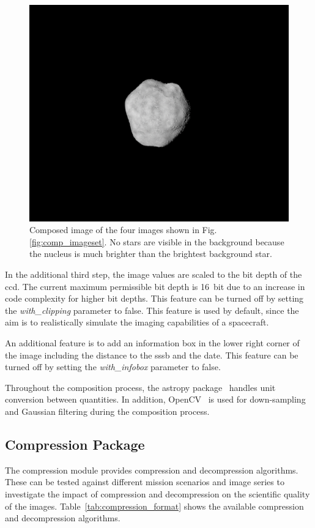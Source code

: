 \begin{figure}[htb]
    \centering
    \includegraphics[width=\textwidth]{doc/thesis/0_figures/composition/Comp_2017-08-15T115854-575000.png}
    \caption{Composed image of the four images shown in Fig. \ref{fig:comp_imageset}. No stars are visible in the background because the nucleus is much brighter than the brightest background star.}
    \label{fig:comp_composed}
\end{figure}

In the additional third step, the image values are scaled to the bit depth of the \gls{ccd}. The current maximum permissible bit depth is \SI{16}{bit} due to an increase in code complexity for higher bit depths. This feature can be turned off by setting the \textit{with\_clipping} parameter to false. This feature is used by default, since the aim is to realistically simulate the imaging capabilities of a spacecraft.

An additional feature is to add an information box in the lower right corner of the image including the distance to the \gls{sssb} and the date. This feature can be turned off by setting the \textit{with\_infobox} parameter to false.

Throughout the composition process, the astropy package~\cite{robitaille2013astropy, price2018astropy} handles unit conversion between quantities. In addition, OpenCV~\cite{opencv_library} is used for down-sampling and Gaussian filtering during the composition process.

\subsection{Compression Package}
The compression module provides compression and decompression algorithms. These can be tested against different mission scenarios and image series to investigate the impact of compression and decompression on the scientific quality of the images. Table~\ref{tab:compression_format} shows the available compression and decompression algorithms.

